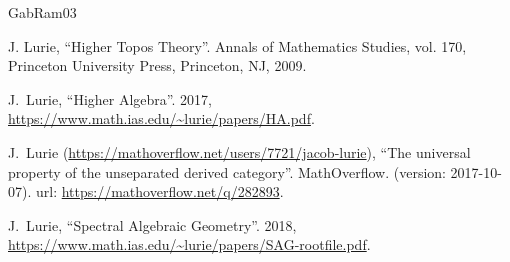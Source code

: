 \documentclass[11pt,leqno]{amsart}
\numberwithin{equation}{section}
\def\A{{\mathbb A}}
\newcommand{\TR}{\operatorname{TR}}
\newcommand{\TC}{\operatorname{TC}}
\begin{document}
\begin{thebibliography}{GabRam03}




 J. Lurie, ``Higher Topos Theory''. Annals of Mathematics Studies, vol. 170, Princeton
University Press, Princeton, NJ, 2009.


 J.~Lurie, ``Higher Algebra''. 2017, \url{https://www.math.ias.edu/~lurie/papers/HA.pdf}.

 J.~Lurie (\url{https://mathoverflow.net/users/7721/jacob-lurie}), ``The universal property
of the unseparated derived category''. MathOverflow. (version: 2017-10-07). url: \url{https://mathoverflow.net/q/282893}.

 J.~Lurie, ``Spectral Algebraic Geometry''. 2018, \url{https://www.math.ias.edu/~lurie/papers/SAG-rootfile.pdf}.






\end{thebibliography}
\end{document}
